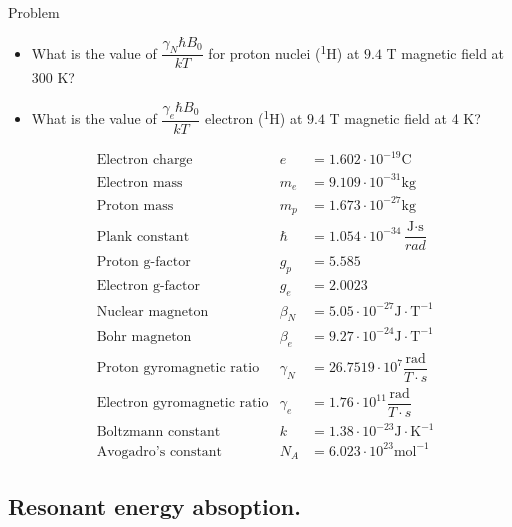 \documentclass{beamer}
\begin{document}
\begin{frame}
	\begin{block}{Problem}
		\begin{itemize}
			\item What is the value of $\dfrac{\gamma_N \hbar B_0}{kT}$ for proton nuclei (\textsuperscript{1}H) at $9.4$ T magnetic field at 300 K?
			\item What is the value of $\dfrac{\gamma_e \hbar B_0}{kT}$ electron (\textsuperscript{1}H) at $9.4$ T magnetic field at 4 K?
		\end {itemize}      
	\end{block}
	{\tiny
	\begin{align*}
	&\text{Electron charge } &e &= 1.602 \cdot 10^{-19} \text{C}\\
	&\text{Electron mass } &m_e &= 9.109 \cdot 10^{-31} \text{kg} \\
	&\text{Proton mass}  &m_p &=  1.673 \cdot 10^{-27} \text{kg}  \\
	&\text{Plank constant}  &\hbar &=  1.054 \cdot 10^{-34} \dfrac{\text{J} \cdot \text{s}}{rad}  \\
	&\text{Proton g-factor}  &g_p &=  5.585 \\
	&\text{Electron g-factor}  &g_e &=  2.0023 \\
	&\text{Nuclear magneton}  &\beta_N &=  5.05 \cdot 10^{-27}  \text{J}\cdot \text{T}^{-1} \\
	&\text{Bohr magneton}  &\beta_e &=  9.27 \cdot 10^{-24}  \text{J}\cdot \text{T}^{-1} \\
	&\text{Proton gyromagnetic ratio}  &\gamma_N &=  26.7519 \cdot 10^{7} \dfrac{\text{rad}}{T \cdot s}\\
	&\text{Electron gyromagnetic ratio}  &\gamma_e &=  1.76 \cdot 10^{11} \dfrac{\text{rad}}{T \cdot s}\\
	&\text{Boltzmann constant}  &k &=  1.38 \cdot 10^{-23} {\text{J}} \cdot \text{K}^{-1}\\
	&\text{Avogadro's constant}  &N_A &=  6.023 \cdot 10^{23} \text{mol}^{-1}
	\end{align*}
    }%
\end{frame}
\subsection{Resonant energy absoption.}
\end{document}
